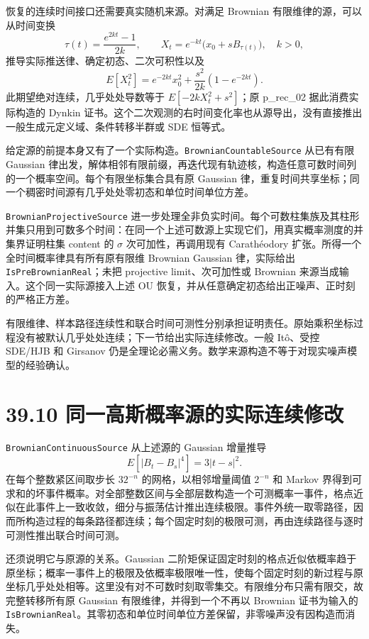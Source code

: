 \documentclass[
  11pt,
  oneside]{book}
\begin{document}
恢复的连续时间接口还需要真实随机来源。对满足 Brownian 有限维律的源，可以从时间变换 \[\tau(t)=\frac{e^{2kt}-1}{2k},\qquad
X_t=e^{-kt}\bigl(x_0+sB_{\tau(t)}\bigr),\quad k>0,\] 推导实际推送律、确定初态、二次可积性以及 \[E[X_t^2]=e^{-2kt}x_0^2+\frac{s^2}{2k}(1-e^{-2kt}).\] 此期望绝对连续，几乎处处导数等于 \(E[-2kX_t^2+s^2]\)；原 p\_rec\_02 据此消费实际构造的 Dynkin 证书。这个二次观测的右时间变化率也从源导出，没有直接推出一般生成元定义域、条件转移半群或 SDE 恒等式。

给定源的前提本身又有了一个实际构造。\nolinkurl{BrownianCountableSource} 从已有有限 Gaussian 律出发，解体相邻有限前缀，再迭代现有轨迹核，构造任意可数时间列的一个概率空间。每个有限坐标集合具有原 Gaussian 律，重复时间共享坐标；同一个稠密时间源有几乎处处零初态和单位时间单位方差。

\nolinkurl{BrownianProjectiveSource} 进一步处理全非负实时间。每个可数柱集族及其柱形并集只用到可数多个时间：在同一个上述可数源上实现它们，用真实概率测度的并集界证明柱集 content 的 \(\sigma\) 次可加性，再调用现有 Carathéodory 扩张。所得一个全时间概率律具有所有原有限维 Brownian Gaussian 律，实际给出 \nolinkurl{IsPreBrownianReal}；未把 projective limit、次可加性或 Brownian 来源当成输入。这个同一实际源接入上述 OU 恢复，并从任意确定初态给出正噪声、正时刻的严格正方差。

有限维律、样本路径连续性和联合时间可测性分别承担证明责任。原始乘积坐标过程没有被默认几乎处处连续；下一节给出实际连续修改。一般 Itô、受控 SDE/HJB 和 Girsanov 仍是全理论必需义务。数学来源构造不等于对现实噪声模型的经验确认。

\section{39.10 同一高斯概率源的实际连续修改}\label{ux540cux4e00ux9ad8ux65afux6982ux7387ux6e90ux7684ux5b9eux9645ux8fdeux7eedux4feeux6539}

\nolinkurl{BrownianContinuousSource} 从上述源的 Gaussian 增量推导 \[E[|B_t-B_s|^4]=3|t-s|^2.\] 在每个整数紧区间取步长 \(32^{-n}\) 的网格，以相邻增量阈值 \(2^{-n}\) 和 Markov 界得到可求和的坏事件概率。对全部整数区间与全部层数构造一个可测概率一事件，格点近似在此事件上一致收敛，细分与振荡估计推出连续极限。事件外统一取零路径，因而所构造过程的每条路径都连续；每个固定时刻的极限可测，再由连续路径与逐时可测性推出联合时间可测。

还须说明它与原源的关系。Gaussian 二阶矩保证固定时刻的格点近似依概率趋于原坐标；概率一事件上的极限及依概率极限唯一性，使每个固定时刻的新过程与原坐标几乎处处相等。这里没有对不可数时刻取零集交。有限维分布只需有限交，故完整转移所有原 Gaussian 有限维律，并得到一个不再以 Brownian 证书为输入的 \nolinkurl{IsBrownianReal}。其零初态和单位时间单位方差保留，非零噪声没有因构造而消失。
\end{document}
